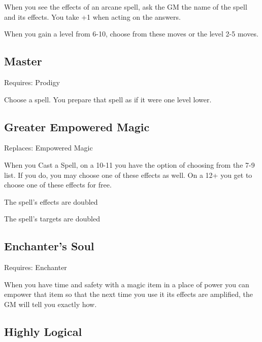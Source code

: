 When you see the effects of an arcane spell, ask the GM the name of the spell and its effects. You take +1 when acting on the answers.

 
\startInstructions
When you gain a level from 6-10, choose from these moves or the level 2-5 moves.
\stopInstructions
 
\subsection{Master}   
 

Requires: Prodigy

 

Choose a spell. You prepare that spell as if it were one level lower.

 
\subsection{Greater Empowered Magic}     
 

Replaces: Empowered Magic

 

When you Cast a Spell, on a 10-11 you have the option of choosing from the 7-9 list. If you do, you may choose one of these effects as well. On a 12+ you get to choose one of these effects for free.

 
\startitemize[1,packed]

\item The spell’s effects are doubled

 
\item The spell’s targets are doubled


\stopitemize
 
\subsection{Enchanter's Soul}    
 

Requires: Enchanter

 

When you have time and safety with a magic item in a place of power you can empower that item so that the next time you use it its effects are amplified, the GM will tell you exactly how.

 
\subsection{Highly Logical}    
 

